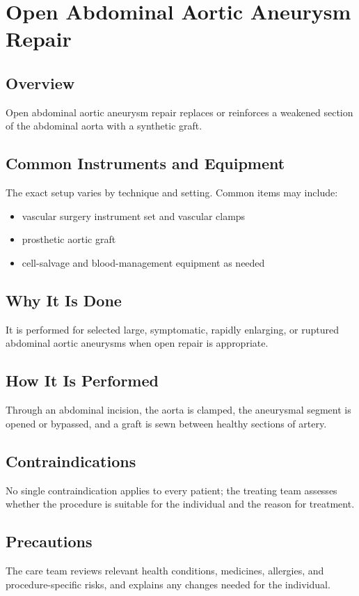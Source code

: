 \chapter{Open Abdominal Aortic Aneurysm Repair}
\section*{Overview}
Open abdominal aortic aneurysm repair replaces or reinforces a weakened section of the abdominal aorta with a synthetic graft.
\section*{Common Instruments and Equipment}
The exact setup varies by technique and setting. Common items may include:
\begin{itemize}[nosep,leftmargin=*]
  \item vascular surgery instrument set and vascular clamps
  \item prosthetic aortic graft
  \item cell-salvage and blood-management equipment as needed
\end{itemize}

\section*{Why It Is Done}
It is performed for selected large, symptomatic, rapidly enlarging, or ruptured abdominal aortic aneurysms when open repair is appropriate.
\section*{How It Is Performed}
Through an abdominal incision, the aorta is clamped, the aneurysmal segment is opened or bypassed, and a graft is sewn between healthy sections of artery.
\section*{Contraindications}
No single contraindication applies to every patient; the treating team assesses whether the procedure is suitable for the individual and the reason for treatment.

\section*{Precautions}
The care team reviews relevant health conditions, medicines, allergies, and procedure-specific risks, and explains any changes needed for the individual.

